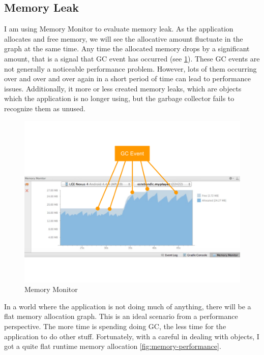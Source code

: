 \subsection{Memory Leak}

I am using Memory Monitor to evaluate memory leak. As the application allocates and free memory, we will see the allocative amount fluctuate in the graph at the same time. Any time the allocated memory drops by a significant amount, that is a signal that GC event has occurred (see \ref{fig:memory-monitor}). These GC events are not generally a noticeable performance problem. However, lots of them occurring over and over and over again in a short period of time can lead to performance issues. Additionally, it more or less created memory leaks, which are objects which the application is no longer using, but the garbage collector fails to recognize them as unused.

\begin{figure}[H]
	\caption[Memory monitor]{Memory Monitor \cite{google.memory-monitor.2015}}
	\label{fig:memory-monitor}
	\centering
	\includegraphics[width=\textwidth, keepaspectratio]{Figures/memory-monitor.png}
	\decoRule
\end{figure}

In a world where the application is not doing much of anything, there will be a flat memory allocation graph. This is an ideal scenario from a performance perspective. The more time is spending doing GC, the less time for the application to do other stuff. Fortunately, with a careful in dealing with objects, I got a quite flat runtime memory allocation \ref{fig:memory-performance}.

